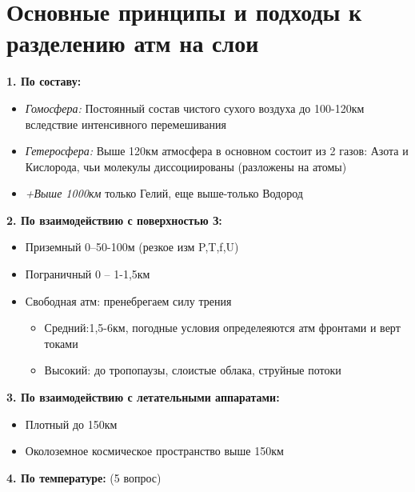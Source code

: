 
\section{Основные принципы и подходы к разделению атм на слои}
\textbf{1. По составу:}
\begin{itemize}
	\item \textit{Гомосфера:} Постоянный состав чистого сухого воздуха до 100-120км вследствие интенсивного перемешивания
	\item \textit{Гетеросфера:} Выше 120км атмосфера в основном состоит из 2 газов: Азота и Кислорода, чьи молекулы диссоциированы (разложены на атомы)
	\item \textit{+Выше 1000км} только Гелий, еще выше-только Водород
\end{itemize}

\textbf{2. По взаимодействию с поверхностью З:}
\begin{itemize}
	\item Приземный 	0–50-100м  (резкое изм P,T,f,U)
	\item Пограничный	0 – 1-1,5км
	\item Свободная атм: пренебрегаем силу трения
	\begin{itemize}
		\item Средний:1,5-6км, погодные условия определеяются атм фронтами и верт токами
		\item  Высокий: до тропопаузы, слоистые облака, струйные потоки
	\end{itemize}
\end{itemize}

\textbf{3. По взаимодействию с летательными аппаратами:}
\begin{itemize}
	\item Плотный 	до 150км
	\item Околоземное космическое пространство	выше 150км
\end{itemize}

\textbf{4. По температуре:}
(5 вопрос)